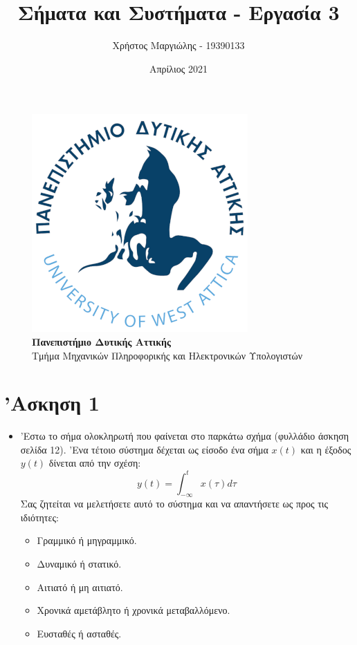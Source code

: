 \documentclass{article}
\title{Σήματα και Συστήματα - Εργασία 3}
\author{Χρήστος Μαργιώλης - 19390133}
\date{Απρίλιος 2021}
\begin{document}
\begin{titlepage}
        \maketitle
        \begin{figure}[t!]
        \begin{center}
        \includegraphics[scale=0.3]{./res/uniwalogo.png} \\
        \Large
        \textbf{Πανεπιστήμιο Δυτικής Αττικής} \\
        \large
        Τμήμα Μηχανικών Πληροφορικής και Ηλεκτρονικών Υπολογιστών
        \end{center}
        \end{figure}
\end{titlepage}

\renewcommand{\contentsname}{Περιεχόμενα}
\tableofcontents

\section{'Ασκηση 1}

\begin{itemize}
        \item 'Εστω το σήμα ολοκληρωτή που φαίνεται στο παρκάτω
                σχήμα (φυλλάδιο άσκηση σελίδα 12). 'Ενα τέτοιο
                σύστημα δέχεται ως είσοδο ένα σήμα $x(t)$ και η έξοδος
                $y(t)$ δίνεται από την σχέση:
                \[y(t) = \int_{-\infty}^{t} x(τ)dτ\]
                Σας ζητείται να μελετήσετε αυτό το σύστημα και να
                απαντήσετε ως προς τις ιδιότητες:
                \begin{itemize}
                        \item Γραμμικό ή μηγραμμικό.
                        \item Δυναμικό ή στατικό.
                        \item Αιτιατό ή μη αιτιατό.
                        \item Χρονικά αμετάβλητο ή χρονικά μεταβαλλόμενο.
                        \item Ευσταθές ή ασταθές.
                \end{itemize}
\end{itemize}
\end{document}
